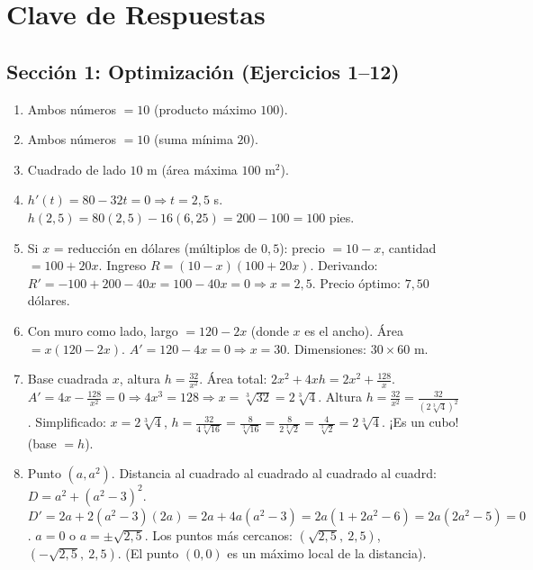 \documentclass[12pt, letterpaper]{article}
\begin{document}
\newpage

\ifmwclaves
  \section{Clave de Respuestas}

  \subsection*{Sección 1: Optimización (Ejercicios 1--12)}

  \begin{enumerate}[series=respuestas, leftmargin=*, label=\textbf{\arabic*.}]
    \item Ambos números $= 10$ (producto máximo $100$).
    \item Ambos números $= 10$ (suma mínima $20$).
    \item Cuadrado de lado $10$ m (área máxima $100$ m$^2$).
    \item $h'(t) = 80 - 32t = 0 \Rightarrow t = 2{,}5$ s. $h(2{,}5) = 80(2{,}5) - 16(6{,}25) = 200 - 100 = 100$ pies.
    \item Si $x$ = reducción en dólares (múltiplos de $0{,}5$): precio $= 10 - x$, cantidad $= 100 + 20x$. Ingreso $R = (10 - x)(100 + 20x)$. Derivando: $R' = -100 + 200 - 40x = 100 - 40x = 0 \Rightarrow x = 2{,}5$. Precio óptimo: $7{,}50$ dólares.
    \item Con muro como lado, largo $= 120 - 2x$ (donde $x$ es el ancho). Área $= x(120 - 2x)$. $A' = 120 - 4x = 0 \Rightarrow x = 30$. Dimensiones: $30 \times 60$ m.
    \item Base cuadrada $x$, altura $h = \frac{32}{x^2}$. Área total: $2x^2 + 4xh = 2x^2 + \frac{128}{x}$. $A' = 4x - \frac{128}{x^2} = 0 \Rightarrow 4x^3 = 128 \Rightarrow x = \sqrt[3]{32} = 2\sqrt[3]{4}$. Altura $h = \frac{32}{x^2} = \frac{32}{(2\sqrt[3]{4})^2}$. Simplificado: $x = 2\sqrt[3]{4}$, $h = \frac{32}{4 \sqrt[3]{16}} = \frac{8}{\sqrt[3]{16}} = \frac{8}{2\sqrt[3]{2}} = \frac{4}{\sqrt[3]{2}} = 2\sqrt[3]{4}$. ¡Es un cubo! (base $= h$).
    \item Punto $(a, a^2)$. Distancia al cuadrado al cuadrado al cuadrado al cuadrd: $D = a^2 + (a^2 - 3)^2$. $D' = 2a + 2(a^2 - 3)(2a) = 2a + 4a(a^2 - 3) = 2a(1 + 2a^2 - 6) = 2a(2a^2 - 5) = 0$. $a = 0$ o $a = \pm\sqrt{2{,}5}$. Los puntos más cercanos: $\left(\sqrt{2{,}5},\ 2{,}5\right)$, $\left(-\sqrt{2{,}5},\ 2{,}5\right)$. (El punto $(0,0)$ es un máximo local de la distancia).

\end{enumerate}
\end{document}
